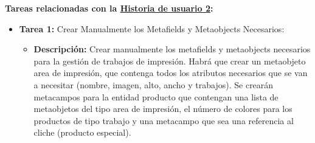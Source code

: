 \documentclass[12pt]{article}
\begin{document}
\textbf{Tareas relacionadas con la \hyperref[sec:historia2]{Historia de usuario 2}:}
\begin{itemize}
    \item \textbf{Tarea 1:} Crear Manualmente los Metafields y Metaobjects Necesarios:
          \begin{itemize}[label=--]
              \item \textbf{Descripción:} Crear manualmente los metafields y metaobjects necesarios para la gestión de trabajos de impresión. Habrá que crear un metaobjeto area de impresión, que contenga todos los atributos necesarios que se van a necesitar (nombre, imagen, alto, ancho y trabajos). Se crearán metacampos para la entidad producto que contengan una lista de metaobjetos del tipo area de impresión, el número de colores para los productos de tipo trabajo y una metacampo que sea una referencia al cliche (producto especial).
          \end{itemize}
\end{itemize}
\end{document}
